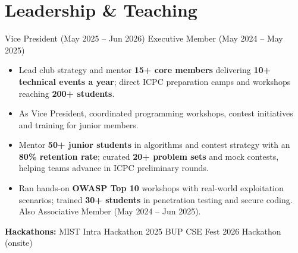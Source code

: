 \section{Leadership \& Teaching}
{Vice President (May 2025 -- Jun 2026) \textbar{} Executive Member (May 2024 -- May 2025)}
{\begin{itemize}
  \item Lead club strategy and mentor \textbf{15+ core members} delivering \textbf{10+ technical events a year}; direct ICPC preparation camps and workshops reaching \textbf{200+ students}.
  \item As Vice President, coordinated programming workshops, contest initiatives and training for junior members.
\end{itemize}}
{\begin{itemize}
  \item Mentor \textbf{50+ junior students} in algorithms and contest strategy with an \textbf{80\% retention rate}; curated \textbf{20+ problem sets} and mock contests, helping teams advance in ICPC preliminary rounds.
\end{itemize}}
{\begin{itemize}
  \item Ran hands-on \textbf{OWASP Top 10} workshops with real-world exploitation scenarios; trained \textbf{30+ students} in penetration testing and secure coding. Also Associative Member (May 2024 -- Jun 2025).
\end{itemize}}
{\small \textbf{Hackathons:} MIST Intra Hackathon 2025 \textbar{} BUP CSE Fest 2026 Hackathon (onsite)}

